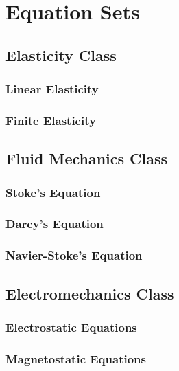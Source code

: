 \clearemptydoublepage
\chapter{Equation Sets}
\label{cha:equationsets}

\section{Elasticity Class}

\subsection{Linear Elasticity}

\subsection{Finite Elasticity}

\section{Fluid Mechanics Class}

\subsection{Stoke's Equation}

\subsection{Darcy's Equation}

\subsection{Navier-Stoke's Equation}

\section{Electromechanics Class}

\subsection{Electrostatic Equations}

\subsection{Magnetostatic Equations}

